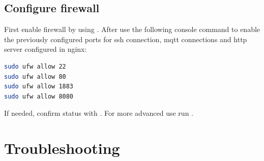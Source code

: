 \subsection{Configure firewall}
First enable firewall by using . After use the following console command to enable the previously configured ports for ssh connection, mqtt connections and http server configured in nginx:
\begin{lstlisting}[frame=none,language=bash,backgroundcolor=\color{gray!15},numbers=none,		basicstyle=\ttfamily]
sudo ufw allow 22
sudo ufw allow 80
sudo ufw allow 1883
sudo ufw allow 8080
\end{lstlisting}
If needed, confirm status with . For more advanced use run .

\section{Troubleshooting}

